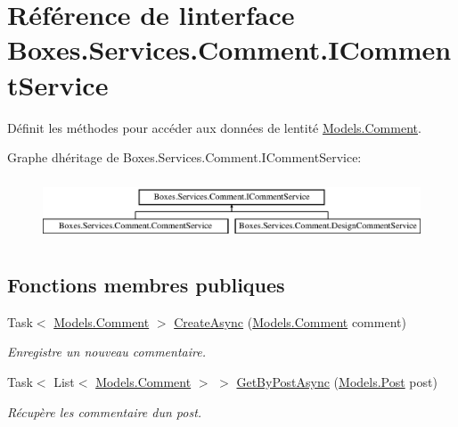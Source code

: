 \hypertarget{interface_boxes_1_1_services_1_1_comment_1_1_i_comment_service}{}\section{Référence de l\textquotesingle{}interface Boxes.\+Services.\+Comment.\+I\+Comment\+Service}
\label{interface_boxes_1_1_services_1_1_comment_1_1_i_comment_service}


Définit les méthodes pour accéder aux données de l\textquotesingle{}entité \hyperlink{class_boxes_1_1_models_1_1_comment}{Models.\+Comment}.  


Graphe d\textquotesingle{}héritage de Boxes.\+Services.\+Comment.\+I\+Comment\+Service\+:\begin{figure}[H]
\begin{center}
\leavevmode
\includegraphics[height=1.860465cm]{interface_boxes_1_1_services_1_1_comment_1_1_i_comment_service}
\end{center}
\end{figure}
\subsection*{Fonctions membres publiques}
\begin{DoxyCompactItemize}
\item 
Task$<$ \hyperlink{class_boxes_1_1_models_1_1_comment}{Models.\+Comment} $>$ \hyperlink{interface_boxes_1_1_services_1_1_comment_1_1_i_comment_service_a12facb39d0bff06586f111fa6d0f302a}{Create\+Async} (\hyperlink{class_boxes_1_1_models_1_1_comment}{Models.\+Comment} comment)
\begin{DoxyCompactList}\small\item\em Enregistre un nouveau commentaire. \end{DoxyCompactList}\item 
Task$<$ List$<$ \hyperlink{class_boxes_1_1_models_1_1_comment}{Models.\+Comment} $>$ $>$ \hyperlink{interface_boxes_1_1_services_1_1_comment_1_1_i_comment_service_ad375a764e72487c3665ffcaeb7176d2f}{Get\+By\+Post\+Async} (\hyperlink{class_boxes_1_1_models_1_1_post}{Models.\+Post} post)
\begin{DoxyCompactList}\small\item\em Récupère les commentaire d\textquotesingle{}un post. \end{DoxyCompactList}\end{DoxyCompactItemize}


